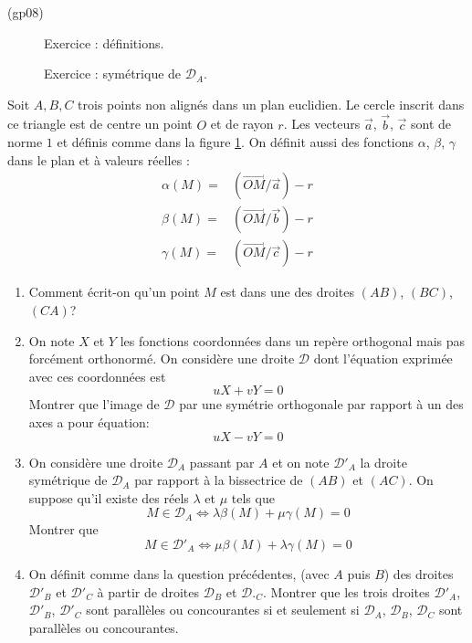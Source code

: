 \begin{tiny}(gp08)\end{tiny}
\begin{figure}[ht]
 \centering

\caption{Exercice  : définitions.}
\label{fig:Egp8_1}
\end{figure}
\begin{figure}[ht]
 \centering

\caption{Exercice : symétrique de $\mathcal D_A$.}
\label{fig:Egp8_2}
\end{figure}
Soit $A,B,C$ trois points non align{\'e}s dans un plan euclidien. Le cercle inscrit dans ce triangle est de centre un point $O$ et de rayon $r$. Les vecteurs $\overrightarrow a$, $\overrightarrow b$, $\overrightarrow c$ sont de norme $1$ et définis comme dans la figure \ref{fig:Egp8_1}. On définit aussi des fonctions $\alpha$, $\beta$, $\gamma$ dans le plan et à valeurs réelles :
\begin{align*}
 \alpha(M) =& (\overrightarrow{OM}/\overrightarrow a) -r \\
 \beta(M) =& (\overrightarrow{OM}/\overrightarrow b) -r \\
 \gamma(M) =& (\overrightarrow{OM}/\overrightarrow c) -r 
\end{align*}

\begin{enumerate}
\item Comment écrit-on qu'un point $M$ est dans une des droites $(AB)$, $(BC)$, $(CA)$?
 \item On note $X$ et $Y$ les fonctions coordonnées dans un  repère orthogonal mais pas forcément orthonormé. On considère une droite $\mathcal D$ dont l'équation exprimée avec ces coordonnées est
\begin{displaymath}
 uX + vY = 0
\end{displaymath}
Montrer que l'image de $\mathcal D$ par une symétrie orthogonale par rapport à un des axes a pour équation:
\begin{displaymath}
 uX - vY = 0
\end{displaymath}
\item On considère une droite $\mathcal D_A$ passant par $A$ et on note $\mathcal D'_A$ la droite sym{\'e}trique de $\mathcal D_A$ par rapport {\`a} la bissectrice de $(AB)$ et $(AC)$. On suppose qu'il existe des réels $\lambda$ et $\mu$ tels que
\begin{displaymath}
 M\in\mathcal D_A \Leftrightarrow \lambda \beta(M) + \mu \gamma(M) = 0
\end{displaymath}
Montrer que 
\begin{displaymath}
 M\in\mathcal D'_A \Leftrightarrow \mu \beta(M) + \lambda \gamma(M) = 0
\end{displaymath}
\item On d{\'e}finit comme dans la question précédentes, (avec $A$ puis $B$) des droites $\mathcal D'_B$ et $\mathcal D'_{C}$ à partir de droites $\mathcal D_B$ et $\mathcal D._{C}$. Montrer que les trois droites $\mathcal D'_A$, $\mathcal D'_B$, $\mathcal D'_C$ sont parall{\`e}les ou concourantes si et seulement si $\mathcal D_A$, $\mathcal D_B$, $\mathcal D_C$ sont parallèles ou concourantes.
\end{enumerate}

 
